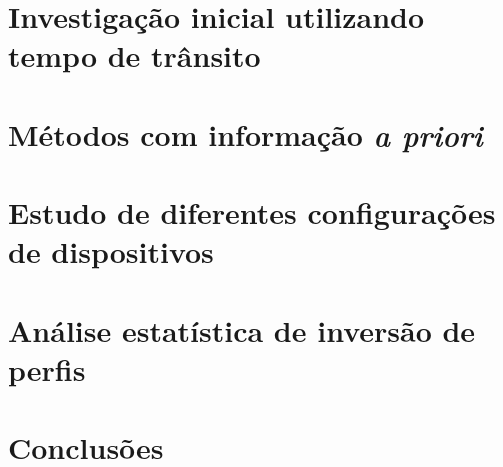 \documentclass{setup/obnzip2}
\begin{document}
	
	\formarcabecalho
	
	\clearpage
	\tableofcontents
	\thispagestyle{plain}
	
	\chapter{Investigação inicial utilizando tempo de trânsito}
	
	
	
	
	\chapter{Métodos com informação \textsl{a priori}}
	
	
	
	
	\chapter{Estudo de diferentes configurações de dispositivos}
	\label{chp:estudo_diferentes_configs}
	
	
	
	\chapter{Análise estatística de inversão de perfis}
	
	\chapter{Conclusões}
	
	\clearpage
	\printbibliography
	\appendix
%	
\end{document}
